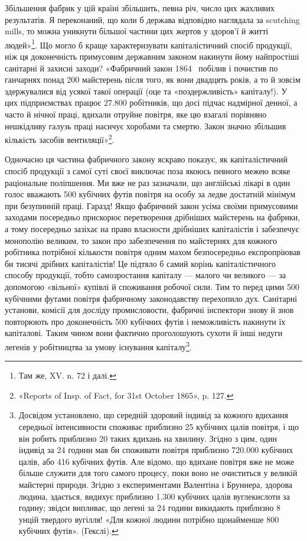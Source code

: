 \parcont{}  %
Збільшення фабрик у цій країні збільшить, певна річ, число цих
жахливих результатів. Я переконаний, що коли б держава відповідно наглядала за
scutching mills, то можна уникнути більшої частини цих жертов у здоров’ї й
житті людей»\footnote{
Там же, \stor{}XV. n. 72 і далі.
}. Що могло б краще характеризувати капіталістичний спосіб продукції, ніж
ця доконечність примусовим державним законом накинути йому
найпростіші санітарні й захисні заходи? «Фабричний закон 1864~
побілив і почистив по ганчарнях понад 200 майстерень після
того, як вони двадцять років, а то й зовсім здержувалися від
усякої такої операції (оце та «поздержливість» капіталу!). У цих
підприємствах працює \num{27.800} робітників, що досі підчас надмірної денної, а
часто й нічної праці, вдихали отруйне повітря,
яке цю взагалі порівняно нешкідливу галузь праці насичує
хоробами та смертю. Закон значно збільшив кількість засобів
вентиляції»\footnote{
«Reports of Insp. of Fact, for 31st October 1865», p. 127.
}.

Одночасно ця частина фабричного закону яскраво показує, як
капіталістичний спосіб продукції з самої суті своєї виключає
поза якоюсь певного межею всяке раціональне поліпшення. Ми
вже не раз зазначали, що англійські лікарі в один голос вважають
500 кубічних футів повітря на особу за ледве достатній мінімум
при безупинній праці. Гаразд! Якщо фабричний закон усіма
своїми примусовими заходами посередньо прискорює перетворення дрібніших
майстерень на фабрики, а тому посередньо
зазіхає на право власности дрібніших капіталістів і забезпечує
монополію великим, то закон про забезпечення по майстернях
для кожного робітника потрібної кількости повітря одним махом
безпосередньо експропріював би тисячі дрібних капіталістів!
Це підтяло б самий корінь капіталістичного способу продукції,
тобто самозростання капіталу — малого чи великого — за допомогою «вільної»
купівлі й споживання робочої сили. Тим то
перед цими 500 кубічними футами повітря фабричному законодавству перехопило
дух. Санітарні установи, комісії для досліду промисловости, фабричні інспектори
знову й знов повторюють про доконечність 500
кубічних футів і неможливість накинути їх капіталові.
Таким чином вони фактично проголошують
сухоти й інші недуги легенів у робітництва за умову існування
капіталу\footnote{
Досвідом установлено, що середній здоровий індивід за кожного
вдихання середньої інтенсивности споживає приблизно 25 кубічних
цалів  повітря, і що він робить приблизно 20 таких вдихань на хвилину. Згідно з
цим, один індивід за 24 години мав би споживати повітря приблизно \num{720.000}
кубічних цалів, або 416 кубічних футів. Але
відомо, що вдихане повітря вже не може більше служити для того самого
процесу, поки воно не очиститься у великій майстерні природи. Згідно
з експериментами Валентіна і Бруннера, здорова людина, здається, видихує
приблизно \num{1.300} кубічних цалів вуглекислоти за годину; звідси
випливає, що легені за 24 години викидають приблизно 8 унцій твердого
вугілля! «Для кожної людини потрібно щонайменше 800 кубічних
футів». (Гекслі).
}.
